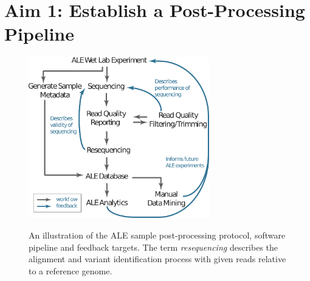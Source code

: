 \documentclass[12pt,final,masters,chapterheads]{ucsd}  %
\begin{document}



\chapter{Aim 1: Establish a Post-Processing Pipeline}


\begin{figure}[h!]
  \caption{An illustration of the ALE sample post-processing protocol, software pipeline and feedback targets. The term \textit{resequencing} describes the alignment and variant identification process with given reads relative to a reference genome.}
  \centering
  \includegraphics[width=0.7\textwidth]{post_processing_protocol.png}
  \label{fig:post_processing_protocol}
\end{figure}
\end{document}
